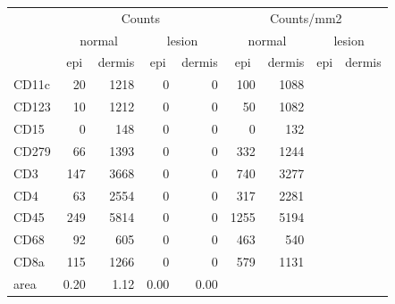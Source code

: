 \begin{tabular}{lrrrr|rrrr}
   \hline
 
         \multicolumn{1}{c}{} & \multicolumn{4}{c|}{Counts} & \multicolumn{4}{c}{Counts/mm2} \\ 
         \multicolumn{1}{c}{} & \multicolumn{2}{c}{normal} & \multicolumn{2}{c|}{lesion} & \multicolumn{2}{c}{normal} & \multicolumn{2}{c}{lesion}  \\ 
         \multicolumn{1}{c}{} & \multicolumn{1}{c}{epi} & dermis & \multicolumn{1}{c}{epi} & \multicolumn{1}{c|}{dermis} & \multicolumn{1}{c}{epi} & dermis & \multicolumn{1}{c}{epi} & dermis  \\ 
         \hline
    CD11c & 20 & 1218 & 0 & 0 & 100 & 1088 &  &  \\ 
  CD123 & 10 & 1212 & 0 & 0 & 50 & 1082 &  &  \\ 
  CD15 & 0 & 148 & 0 & 0 & 0 & 132 &  &  \\ 
  CD279 & 66 & 1393 & 0 & 0 & 332 & 1244 &  &  \\ 
  CD3 & 147 & 3668 & 0 & 0 & 740 & 3277 &  &  \\ 
  CD4 & 63 & 2554 & 0 & 0 & 317 & 2281 &  &  \\ 
  CD45 & 249 & 5814 & 0 & 0 & 1255 & 5194 &  &  \\ 
  CD68 & 92 & 605 & 0 & 0 & 463 & 540 &  &  \\ 
  CD8a & 115 & 1266 & 0 & 0 & 579 & 1131 &  &  \\ 
  area & 0.20 & 1.12 & 0.00 & 0.00 &    &    &    &    \\ 
   \hline
\end{tabular}
